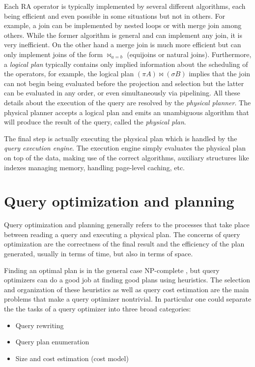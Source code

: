 Each RA operator is typically implemented by several different
algorithms, each being efficient and even possible in some situations
but not in others. For example, a join can be implemented by nested
loops or with merge join among others.  While the former algorithm is
general and can implement any join, it is very inefficient. On the
other hand a merge join is much more efficient but can only implement
joins of the form \(\Join_{a=b}\) (equijoins or natural
joins). Furthermore, a \emph{logical plan} typically contains only
implied information about the scheduling of the operators, for
example, the logical plan \((\pi A) \Join (\sigma B)\) implies that
the join can not begin being evaluated before the projection and
selection but the latter can be evaluated in any order, or even
simultaneously via pipelining. All these details about the execution
of the query are resolved by the \emph{physical planner}. The physical
planner accepts a logical plan and emits an unambiguous algorithm that
will produce the result of the query, called the \emph{physical plan}.


The final step is actually executing the physical plan which is
handled by the \emph{query execution engine}. The execution engine
simply evaluates the physical plan on top of the data, making use of
the correct algorithms, auxiliary structures like indexes managing
memory, handling page-level caching, etc.

\section{Query optimization and planning}

Query optimization and planning generally refers to the processes that
take place between reading a query and executing a physical plan. The
concerns of query optimization are the correctness of the final result and
the efficiency of the plan generated, usually in terms of time, but
also in terms of space.

Finding an optimal plan is in the general case NP-complete
\cite{ullmanInformationIntegrationUsing1997}, but query optimizers can
do a good job at finding good plans using heuristics. The selection
and organization of these heuristics as well as query cost estimation
are the main problems that make a query optimizer nontrivial. In
particular one could separate the the tasks of a query optimizer
into three broad categories:

\begin{itemize}
\item Query rewriting
\item Query plan enumeration
\item Size and cost estimation (cost model)
\end{itemize}


